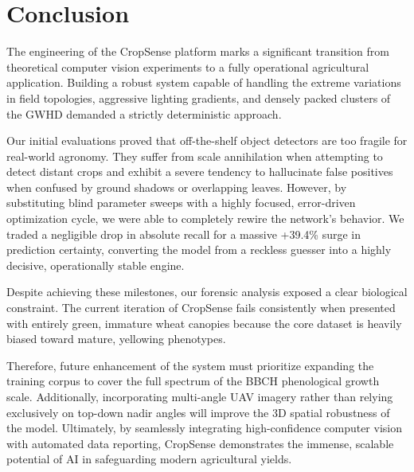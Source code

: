 \section{Conclusion}
\label{sec:conclusion}

The engineering of the CropSense platform marks a significant transition from theoretical computer vision experiments to a fully operational agricultural application. Building a robust system capable of handling the extreme variations in field topologies, aggressive lighting gradients, and densely packed clusters of the GWHD demanded a strictly deterministic approach.

Our initial evaluations proved that off-the-shelf object detectors are too fragile for real-world agronomy. They suffer from scale annihilation when attempting to detect distant crops and exhibit a severe tendency to hallucinate false positives when confused by ground shadows or overlapping leaves. However, by substituting blind parameter sweeps with a highly focused, error-driven optimization cycle, we were able to completely rewire the network's behavior. We traded a negligible drop in absolute recall for a massive +39.4\% surge in prediction certainty, converting the model from a reckless guesser into a highly decisive, operationally stable engine.

Despite achieving these milestones, our forensic analysis exposed a clear biological constraint. The current iteration of CropSense fails consistently when presented with entirely green, immature wheat canopies because the core dataset is heavily biased toward mature, yellowing phenotypes. 

Therefore, future enhancement of the system must prioritize expanding the training corpus to cover the full spectrum of the BBCH phenological growth scale. Additionally, incorporating multi-angle UAV imagery rather than relying exclusively on top-down nadir angles will improve the 3D spatial robustness of the model. Ultimately, by seamlessly integrating high-confidence computer vision with automated data reporting, CropSense demonstrates the immense, scalable potential of AI in safeguarding modern agricultural yields.
